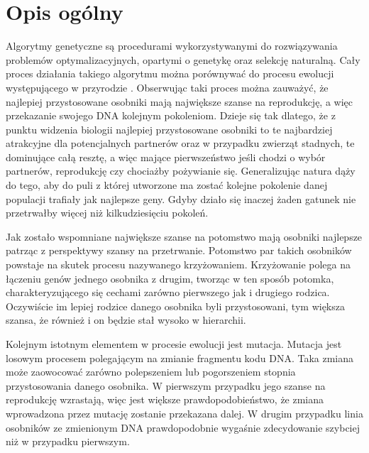 \documentclass[twoside]{iisthesis}
\begin{document}
\section{Opis ogólny}
Algorytmy genetyczne są procedurami wykorzystywanymi do rozwiązywania problemów optymalizacyjnych, opartymi o genetykę oraz selekcję naturalną. Cały proces działania takiego algorytmu można porównywać do procesu ewolucji występującego w przyrodzie \cite{ga_book}. Obserwując taki proces można zauważyć, że najlepiej przystosowane osobniki mają największe szanse na reprodukcję, a więc przekazanie swojego DNA kolejnym pokoleniom. Dzieje się tak dlatego, że z punktu widzenia biologii najlepiej przystosowane osobniki to te najbardziej atrakcyjne dla potencjalnych partnerów oraz w przypadku zwierząt stadnych, te dominujące całą resztę, a więc mające pierwszeństwo jeśli chodzi o wybór partnerów, reprodukcję czy chociażby pożywianie się. Generalizując natura dąży do tego, aby do puli z której utworzone ma zostać kolejne pokolenie danej populacji trafiały jak najlepsze geny. Gdyby działo się inaczej żaden gatunek nie przetrwałby więcej niż kilkudziesięciu pokoleń.

Jak zostało wspomniane największe szanse na potomstwo mają osobniki najlepsze patrząc z perspektywy szansy na przetrwanie. Potomstwo par takich osobników powstaje na skutek procesu nazywanego krzyżowaniem. Krzyżowanie polega na łączeniu genów jednego osobnika z drugim, tworząc w ten sposób potomka, charakteryzującego się cechami zarówno pierwszego jak i drugiego rodzica. Oczywiście im lepiej rodzice danego osobnika byli przystosowani, tym większa szansa, że również i on będzie stał wysoko w hierarchii.

Kolejnym istotnym elementem w procesie ewolucji jest mutacja. Mutacja jest losowym procesem polegającym na zmianie fragmentu kodu DNA. Taka zmiana może zaowocować zarówno polepszeniem lub pogorszeniem stopnia przystosowania danego osobnika. W pierwszym przypadku jego szanse na reprodukcję wzrastają, więc jest większe prawdopodobieństwo, że zmiana wprowadzona przez mutację zostanie przekazana dalej. W drugim przypadku linia osobników ze zmienionym DNA prawdopodobnie wygaśnie zdecydowanie szybciej niż w przypadku pierwszym.
\end{document}
